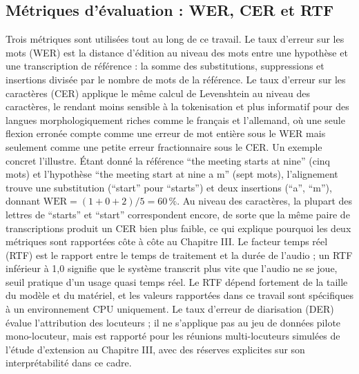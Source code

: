 \documentclass[12pt]{report}
\begin{document}
\subsection{Métriques d'évaluation : WER, CER et RTF}
Trois métriques sont utilisées tout au long de ce travail. Le taux d'erreur sur les mots (WER) est la distance d'édition au niveau des mots entre une hypothèse et une transcription de référence : la somme des substitutions, suppressions et insertions divisée par le nombre de mots de la référence. Le taux d'erreur sur les caractères (CER) applique le même calcul de Levenshtein au niveau des caractères, le rendant moins sensible à la tokenisation et plus informatif pour des langues morphologiquement riches comme le français et l'allemand, où une seule flexion erronée compte comme une erreur de mot entière sous le WER mais seulement comme une petite erreur fractionnaire sous le CER.
Un exemple concret l'illustre. Étant donné la référence \enquote{the meeting starts at nine} (cinq mots) et l'hypothèse \enquote{the meeting start at nine a m} (sept mots), l'alignement trouve une substitution (\enquote{start} pour \enquote{starts}) et deux insertions (\enquote{a}, \enquote{m}), donnant $\mathrm{WER} = (1+0+2)/5 = 60\,\%$. Au niveau des caractères, la plupart des lettres de \enquote{starts} et \enquote{start} correspondent encore, de sorte que la même paire de transcriptions produit un CER bien plus faible, ce qui explique pourquoi les deux métriques sont rapportées côte à côte au Chapitre III.
Le facteur temps réel (RTF) est le rapport entre le temps de traitement et la durée de l'audio ; un RTF inférieur à 1,0 signifie que le système transcrit plus vite que l'audio ne se joue, seuil pratique d'un usage quasi temps réel. Le RTF dépend fortement de la taille du modèle et du matériel, et les valeurs rapportées dans ce travail sont spécifiques à un environnement CPU uniquement. Le taux d'erreur de diarisation (DER) évalue l'attribution des locuteurs ; il ne s'applique pas au jeu de données pilote mono-locuteur, mais est rapporté pour les réunions multi-locuteurs simulées de l'étude d'extension au Chapitre III, avec des réserves explicites sur son interprétabilité dans ce cadre.
\end{document}
